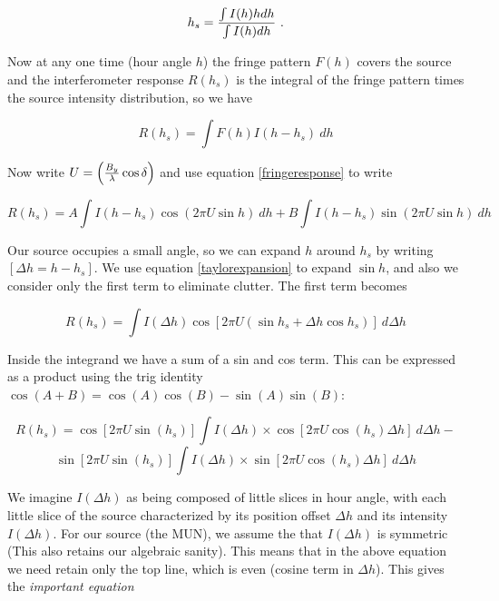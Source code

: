\documentclass[11pt,preprint]{aastex}
\begin{document}
\begin{equation}
h_s = { \int I(h)h dh \over \int I(h) dh} \ .
\end{equation}

	Now at any one time (hour angle $h$) the fringe pattern $F(h)$
covers the source and the interferometer response $R(h_s)$ is the integral
of the fringe pattern times the source intensity distribution, so we
have

\begin{equation}
R(h_s) = \int F(h) I(h-h_s) \ d h
\end{equation}

\noindent Now write $U = \left( {B_y \over \lambda} \cos\delta \right)$
and use equation \ref {fringeresponse} to write

\begin{equation} 
R(h_s) = A \int I(h-h_s) \cos( 2\pi U \sin h) \ dh +  
	B \int I(h-h_s) \sin( 2\pi U \sin h) \ dh
\end{equation} 

	Our source occupies a small angle, so we can expand $h$ around $h_s$
by writing $[\Delta h = h-h_s]$. We use equation \ref{taylorexpansion} to
expand $\sin h$, and also we consider only the first term to eliminate
clutter. The first term becomes

\begin{equation}
R(h_s) = \int I(\Delta h)  \cos [2 \pi U ( \sin h_s + \Delta h \cos h_s )]
\ d\Delta h
\end{equation}

\noindent Inside the integrand we have a sum of a sin and cos term. This
can be expressed as a product using the trig identity $\cos(A+B) =
\cos(A)\cos(B) - \sin(A)\sin(B)$:

\begin{equation} \label{fringeeqn}
R(h_s) = \cos \left[ 2 \pi U \sin(h_s) \right] \int I(\Delta h)  
  \times \cos \left[ 2 \pi U \cos(h_s) \Delta h \right] \ d \Delta h
-
\end{equation}
$$
\sin \left[ 2 \pi U \sin(h_s) \right] \int I(\Delta h) 
  \times \sin \left[ 2 \pi U \cos(h_s) \Delta h \right] \ d\Delta h
$$

	We imagine $I(\Delta h)$ as being composed of little slices in
hour angle, with  each little slice of the source characterized by its
position offset $\Delta h$ and its intensity $I(\Delta h)$. For our
source (the MUN), we assume the that $I(\Delta h)$ is symmetric (This
also retains our algebraic sanity). This means that in the above
equation we need retain only the top line, which is even (cosine term in
$\Delta h$). This gives the {\it important equation}
\end{document}
